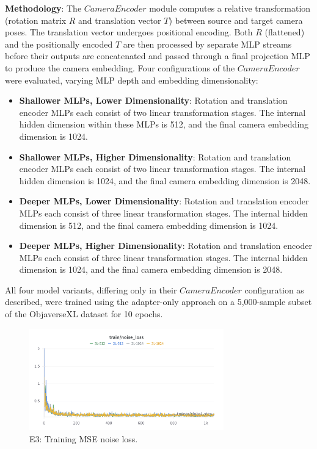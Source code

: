 \textbf{Methodology}:
The $CameraEncoder$ module computes a relative transformation (rotation matrix $R$ and translation vector $T$) between source and target camera poses. The translation vector undergoes positional encoding. Both $R$ (flattened) and the positionally encoded $T$ are then processed by separate MLP streams before their outputs are concatenated and passed through a final projection MLP to produce the camera embedding.
Four configurations of the $CameraEncoder$ were evaluated, varying MLP depth and embedding dimensionality:
\begin{itemize}
  \item \textbf{Shallower MLPs, Lower Dimensionality}: Rotation and translation encoder MLPs each consist of two linear transformation stages. The internal hidden dimension within these MLPs is 512, and the final camera embedding dimension is 1024.
  \item \textbf{Shallower MLPs, Higher Dimensionality}: Rotation and translation encoder MLPs each consist of two linear transformation stages. The internal hidden dimension is 1024, and the final camera embedding dimension is 2048.
  \item \textbf{Deeper MLPs, Lower Dimensionality}: Rotation and translation encoder MLPs each consist of three linear transformation stages. The internal hidden dimension is 512, and the final camera embedding dimension is 1024.
  \item \textbf{Deeper MLPs, Higher Dimensionality}: Rotation and translation encoder MLPs each consist of three linear transformation stages. The internal hidden dimension is 1024, and the final camera embedding dimension is 2048.
\end{itemize}
All four model variants, differing only in their $CameraEncoder$ configuration as described, were trained using the adapter-only approach on a 5,000-sample subset of the ObjaverseXL dataset for 10 epochs.

\begin{figure}[htbp]
  \centering
  \includegraphics[width=0.75\textwidth]{images/experiments/cam_depth/train.png}
  \caption{E3: Training MSE noise loss.}
  \label{fig:exp_cam_depth_train_loss}
\end{figure}

